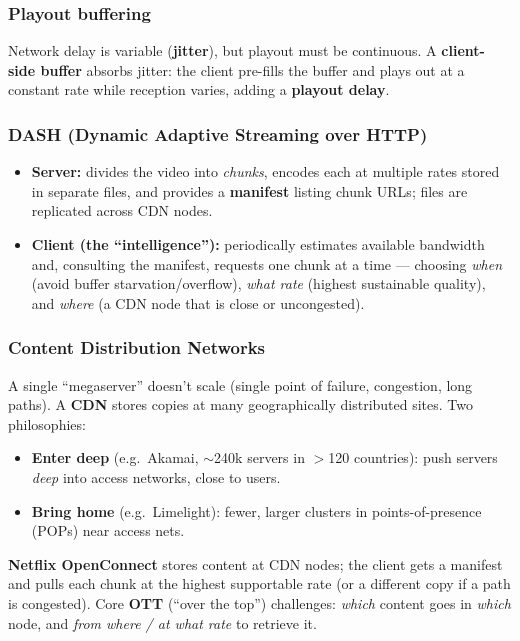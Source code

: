 \documentclass[hidelinks]{article}
\begin{document}
\subsubsection{Playout buffering}
Network delay is variable (\textbf{jitter}), but playout must be continuous.
A \textbf{client-side buffer} absorbs jitter: the client pre-fills the buffer
and plays out at a constant rate while reception varies, adding a
\textbf{playout delay}.

\subsubsection{DASH (Dynamic Adaptive Streaming over HTTP)}
\begin{itemize}
    \item \textbf{Server:} divides the video into \emph{chunks}, encodes each
    at multiple rates stored in separate files, and provides a
    \textbf{manifest} listing chunk URLs; files are replicated across CDN
    nodes.
    \item \textbf{Client (the ``intelligence''):} periodically estimates
    available bandwidth and, consulting the manifest, requests one chunk at a
    time --- choosing \emph{when} (avoid buffer starvation/overflow),
    \emph{what rate} (highest sustainable quality), and \emph{where} (a CDN
    node that is close or uncongested).
\end{itemize}

\subsubsection{Content Distribution Networks}
A single ``megaserver'' doesn't scale (single point of failure, congestion,
long paths). A \textbf{CDN} stores copies at many geographically distributed
sites. Two philosophies:
\begin{itemize}
    \item \textbf{Enter deep} (e.g.\ Akamai, $\sim$240k servers in $>$120
    countries): push servers \emph{deep} into access networks, close to
    users.
    \item \textbf{Bring home} (e.g.\ Limelight): fewer, larger clusters in
    points-of-presence (POPs) near access nets.
\end{itemize}
\textbf{Netflix OpenConnect} stores content at CDN nodes; the client gets a
manifest and pulls each chunk at the highest supportable rate (or a different
copy if a path is congested). Core \textbf{OTT} (``over the top'') challenges:
\emph{which} content goes in \emph{which} node, and \emph{from where / at what
rate} to retrieve it.
\end{document}
